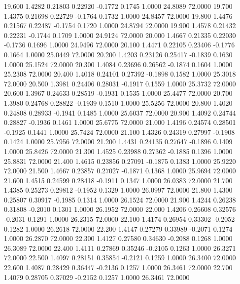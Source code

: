   19.600   1.4282   0.21803   0.22920  -0.1772   0.1745   1.0000  24.8089  72.0000
  19.700   1.4375   0.21698   0.22729  -0.1764   0.1732   1.0000  24.8457  72.0000
  19.800   1.4476   0.21567   0.22487  -0.1754   0.1720   1.0000  24.8794  72.0000
  19.900   1.4578   0.21432   0.22231  -0.1744   0.1709   1.0000  24.9124  72.0000
  20.000   1.4667   0.21335   0.22030  -0.1736   0.1696   1.0000  24.9496  72.0000
  20.100   1.4471   0.22105   0.23406  -0.1776   0.1664   1.0000  25.0449  72.0000
  20.200   1.4203   0.23126   0.25417  -0.1839   0.1630   1.0000  25.1524  72.0000
  20.300   1.4084   0.23696   0.26562  -0.1874   0.1604   1.0000  25.2308  72.0000
  20.400   1.4018   0.24101   0.27392  -0.1898   0.1582   1.0000  25.3018  72.0000
  20.500   1.3981   0.24406   0.28031  -0.1917   0.1559   1.0000  25.3732  72.0000
  20.600   1.3967   0.24633   0.28519  -0.1931   0.1535   1.0000  25.4477  72.0000
  20.700   1.3980   0.24768   0.28822  -0.1939   0.1510   1.0000  25.5256  72.0000
  20.800   1.4020   0.24808   0.28933  -0.1941   0.1485   1.0000  25.6037  72.0000
  20.900   1.4092   0.24744   0.28827  -0.1936   0.1461   1.0000  25.6775  72.0000
  21.000   1.4196   0.24574   0.28501  -0.1925   0.1441   1.0000  25.7424  72.0000
  21.100   1.4326   0.24319   0.27997  -0.1908   0.1424   1.0000  25.7956  72.0000
  21.200   1.4431   0.24135   0.27647  -0.1896   0.1409   1.0000  25.8426  72.0000
  21.300   1.4525   0.23988   0.27362  -0.1885   0.1396   1.0000  25.8831  72.0000
  21.400   1.4615   0.23856   0.27091  -0.1875   0.1383   1.0000  25.9220  72.0000
  21.500   1.4667   0.23857   0.27027  -0.1871   0.1368   1.0000  25.9694  72.0000
  21.600   1.4515   0.24599   0.28418  -0.1911   0.1347   1.0000  26.0383  72.0000
  21.700   1.4385   0.25273   0.29812  -0.1952   0.1329   1.0000  26.0997  72.0000
  21.800   1.4300   0.25807   0.30917  -0.1985   0.1314   1.0000  26.1524  72.0000
  21.900   1.4244   0.26238   0.31808  -0.2010   0.1301   1.0000  26.1952  72.0000
  22.000   1.4206   0.26608   0.32576  -0.2031   0.1291   1.0000  26.2315  72.0000
  22.100   1.4174   0.26954   0.33302  -0.2052   0.1282   1.0000  26.2618  72.0000
  22.200   1.4147   0.27279   0.33989  -0.2071   0.1274   1.0000  26.2870  72.0000
  22.300   1.4127   0.27580   0.34630  -0.2088   0.1268   1.0000  26.3089  72.0000
  22.400   1.4111   0.27869   0.35246  -0.2105   0.1263   1.0000  26.3271  72.0000
  22.500   1.4097   0.28151   0.35854  -0.2121   0.1259   1.0000  26.3400  72.0000
  22.600   1.4087   0.28429   0.36447  -0.2136   0.1257   1.0000  26.3461  72.0000
  22.700   1.4079   0.28705   0.37029  -0.2152   0.1257   1.0000  26.3461  72.0000
